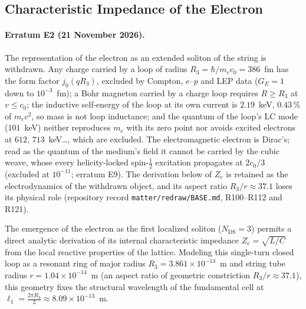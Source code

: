 \documentclass[11pt,a4paper]{article}
\theoremstyle{plain}
\theoremstyle{remark}
\newcommand{\Ncd}{\ensuremath{N_{\mathrm{DS}}}}
\begin{document}
\subsection{Characteristic Impedance of the Electron}
\label{sec:electron_impedance}
\paragraph{Erratum E2 (21 November 2026).} The representation of the electron as an extended soliton of the string is withdrawn. Any charge carried by a loop of radius $R_3 = \hbar/m_e c_0 = 386$~fm has the form factor $j_0(qR_3)$, excluded by Compton, $e$--$p$ and LEP data ($G_E = 1$ down to $10^{-3}$~fm); a Bohr magneton carried by a charge loop requires $R \ge R_3$ at $v \le c_0$; the inductive self-energy of the loop at its own current is $2.19$~keV, $0.43\,\%$ of $m_e c^2$, so mass is not loop inductance; and the quantum of the loop's LC mode ($101$~keV) neither reproduces $m_e$ with its zero point nor avoids excited electrons at $612$, $713$~keV\ldots, which are excluded. The electromagnetic electron is Dirac's; read as the quantum of the medium's field it cannot be carried by the cubic weave, whose every helicity-locked spin-$\tfrac12$ excitation propagates at $2c_0/3$ (excluded at $10^{-11}$; erratum E9). The derivation below of $Z_e$ is retained as the electrodynamics of the withdrawn object, and its aspect ratio $R_3/r \approx 37.1$ loses its physical role (repository record \texttt{matter/redraw/BASE.md}, R100--R112 and R121).

The emergence of the electron as the first localized soliton ($\Ncd=3$) permits a direct analytic derivation of its internal characteristic impedance $Z_e = \sqrt{L/C}$ from the local reactive properties of the lattice. Modeling this single-turn closed loop as a resonant ring of major radius $R_3 = 3.861 \times 10^{-13}$~m and string tube radius $r = 1.04 \times 10^{-14}$~m (an aspect ratio of geometric constriction $R_3/r \approx 37.1$), this geometry fixes the structural wavelength of the fundamental cell at $\ell_1 = \frac{2\pi R_3}{3} \approx 8.09 \times 10^{-13}$~m.
\end{document}
